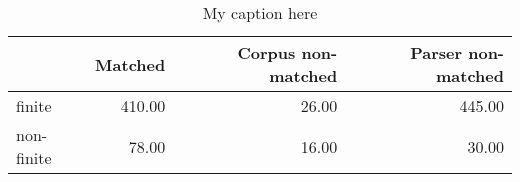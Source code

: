 \begin{table}[!ht]
\centering
\begin{tabular}{lrrr}
\toprule
{} &  Matched &  Corpus non-matched &  Parser non-matched \\
\midrule
finite     &   410.00 &               26.00 &              445.00 \\
non-finite &    78.00 &               16.00 &               30.00 \\
\bottomrule
\end{tabular}
\caption{My caption here}
\label{tab:FINITENESS-ocd-data}
\end{table}